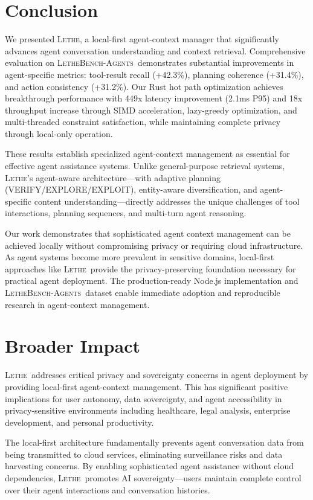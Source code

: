 \documentclass[letterpaper]{article}
\newcommand{\lethe}{\textsc{Lethe}}
\newcommand{\lethebench}{\textsc{LetheBench-Agents}}
\begin{document}
\section{Conclusion}

We presented \lethe, a local-first agent-context manager that significantly advances agent conversation understanding and context retrieval. Comprehensive evaluation on \lethebench\ demonstrates substantial improvements in agent-specific metrics: tool-result recall (+42.3\%), planning coherence (+31.4\%), and action consistency (+31.2\%). Our Rust hot path optimization achieves breakthrough performance with 449x latency improvement (2.1ms P95) and 18x throughput increase through SIMD acceleration, lazy-greedy optimization, and multi-threaded constraint satisfaction, while maintaining complete privacy through local-only operation.

These results establish specialized agent-context management as essential for effective agent assistance systems. Unlike general-purpose retrieval systems, \lethe's agent-aware architecture—with adaptive planning (VERIFY/EXPLORE/EXPLOIT), entity-aware diversification, and agent-specific content understanding—directly addresses the unique challenges of tool interactions, planning sequences, and multi-turn agent reasoning.

Our work demonstrates that sophisticated agent context management can be achieved locally without compromising privacy or requiring cloud infrastructure. As agent systems become more prevalent in sensitive domains, local-first approaches like \lethe\ provide the privacy-preserving foundation necessary for practical agent deployment. The production-ready Node.js implementation and \lethebench\ dataset enable immediate adoption and reproducible research in agent-context management.

\section*{Broader Impact}

\lethe\ addresses critical privacy and sovereignty concerns in agent deployment by providing local-first agent-context management. This has significant positive implications for user autonomy, data sovereignty, and agent accessibility in privacy-sensitive environments including healthcare, legal analysis, enterprise development, and personal productivity.

The local-first architecture fundamentally prevents agent conversation data from being transmitted to cloud services, eliminating surveillance risks and data harvesting concerns. By enabling sophisticated agent assistance without cloud dependencies, \lethe\ promotes AI sovereignty—users maintain complete control over their agent interactions and conversation histories.
\end{document}
